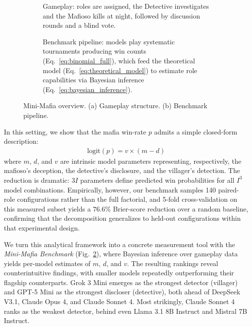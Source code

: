 \documentclass{article}
\begin{document}
\begin{figure}[t!]
    \centering
    \begin{subfigure}[t]{0.48\linewidth}
        \centering
        \resizebox{\linewidth}{7cm}{%
        }
        \caption{Gameplay: roles are assigned, the Detective investigates and the Mafioso kills at night, followed by discussion rounds and a blind vote.}
        \label{fig:mini-mafia-gameplay}
    \end{subfigure}
    \hfill
    \begin{subfigure}[t]{0.48\linewidth}
        \centering
        \resizebox{\linewidth}{7cm}{%
        }
        \caption{Benchmark pipeline: models play systematic tournaments producing win counts (Eq.~\ref{eq:binomial_full}), which feed the theoretical model (Eq.~\ref{eq:theoretical_model}) to estimate role capabilities via Bayesian inference (Eq.~\ref{eq:bayesian_inference}).}
        \label{fig:mini-mafia-benchmark}
    \end{subfigure}
    \caption{Mini-Mafia overview. (a) Gameplay structure. (b) Benchmark pipeline.}
    \label{fig:mini-mafia-overview}
\end{figure}


In this setting, we show that the mafia win-rate $p$ admits a simple closed-form description:
\begin{align}
    \text{logit}(p) = v \times (m - d)
\end{align}
where $m$, $d$, and $v$ are intrinsic model parameters representing, respectively, the mafioso's deception, the detective's disclosure, and the villager's detection. The reduction is dramatic: $3I$ parameters define predicted win probabilities for all $I^3$ model combinations. Empirically, however, our benchmark samples 140 paired-role configurations rather than the full factorial, and 5-fold cross-validation on this measured subset yields a $76.6\%$ Brier-score reduction over a random baseline, confirming that the decomposition generalizes to held-out configurations within that experimental design.

We turn this analytical framework into a concrete measurement tool with the \textit{Mini-Mafia Benchmark} (Fig.~\ref{fig:mini-mafia-benchmark}), where Bayesian inference over gameplay data yields per-model estimates of $m$, $d$, and $v$. The resulting rankings reveal counterintuitive findings, with smaller models repeatedly outperforming their flagship counterparts. Grok 3 Mini emerges as the strongest detector (villager) and GPT-5 Mini as the strongest discloser (detective), both ahead of DeepSeek V3.1, Claude Opus 4, and Claude Sonnet 4. Most strikingly, Claude Sonnet 4 ranks as the weakest detector, behind even Llama 3.1 8B Instruct and Mistral 7B Instruct.
\end{document}
